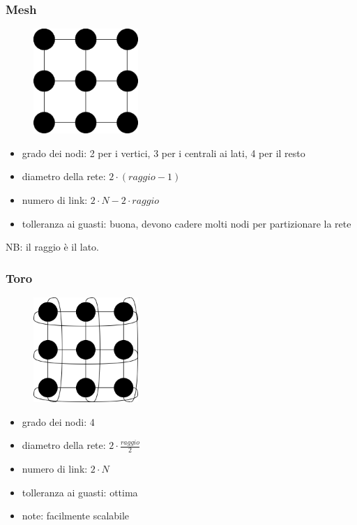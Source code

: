 \subsubsection{Mesh}
\begin{figure}[H]
    \centering
    \includegraphics[width=150px]{images/2_Tassonomia_di_Flynn/mesh-topology.png}
\end{figure}

\begin{itemize}
    \item grado dei nodi: 2 per i vertici, 3 per i centrali ai lati, 4 per il resto
    \item diametro della rete: $2 \cdot (raggio -1)$
    \item numero di link: $2 \cdot N - 2 \cdot raggio$
    \item tolleranza ai guasti: buona, devono cadere molti nodi per partizionare la rete
\end{itemize}
NB: il raggio è il lato.

\subsubsection{Toro}
\begin{figure}[H]
    \centering
    \includegraphics[width=150px]{images/2_Tassonomia_di_Flynn/torus-topology.png}
\end{figure}

\begin{itemize}
    \item grado dei nodi: 4
    \item diametro della rete: $2 \cdot \frac{raggio}{2}$
    \item numero di link: $2 \cdot N$
    \item tolleranza ai guasti: ottima
    \item note: facilmente scalabile
\end{itemize}


